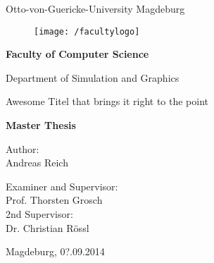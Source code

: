 \documentclass[thesis.tex]{subfiles}
\begin{document}
\thispagestyle {empty}

\begin{center}
\begin{Large}
Otto-von-Guericke-University Magdeburg\\

\begin{figure}
	\centering
	\texttt{[image: /facultylogo]}
	\label{fig:logoinffak}
\end{figure}

\vspace{3mm}

\textbf{Faculty of Computer Science}\\
\end{Large}

\vspace{3mm}

Department of Simulation and Graphics\\

\vspace{1cm}
\begin{LARGE}
Awesome Titel that brings it right to the point\\
\end{LARGE}
\vspace{15mm}
{\Huge \textbf{Master Thesis}}\\
\vspace{15mm}

Author:\\
\vspace{4mm}
{\Large Andreas Reich}\\

\vspace{10mm}

Examiner and Supervisor:\\
\vspace{2mm}
{\Large Prof. Thorsten Grosch}\\
\vspace{4mm}
2nd Supervisor:\\
\vspace{2mm}
{\Large Dr. Christian Rössl}\\
\vspace{4mm}

{\large Magdeburg, 0?.09.2014}\\

\vspace{40mm}

\end{center}
\clearpage
\end{document}
